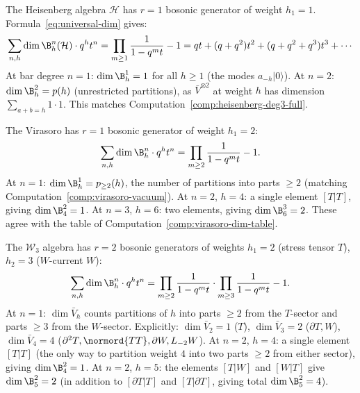 \begin{computation}\label{comp:verify-heisenberg}
The Heisenberg algebra $\mathcal{H}$ has $r = 1$ bosonic generator
of weight $h_1 = 1$.  Formula~\eqref{eq:universal-dim} gives:
\[
\sum_{n,h} \dim \B^n_h(\mathcal{H}) \cdot q^h t^n
= \prod_{m \geq 1} \frac{1}{1 - q^m t} - 1
= qt + (q + q^2)t^2 + (q + q^2 + q^3)t^3 + \cdots
\]
At bar degree $n = 1$: $\dim \B^1_h = 1$ for all $h \geq 1$
(the modes $a_{-h}|0\rangle$).  At $n = 2$: $\dim \B^2_h = p(h)$
(unrestricted partitions), as $\bar{V}^{\otimes 2}$ at weight $h$
has dimension $\sum_{a+b=h} 1 \cdot 1$.
This matches
Computation~\ref{comp:heisenberg-deg3-full}.
\end{computation}

\begin{computation}\label{comp:verify-virasoro}
The Virasoro has $r = 1$ bosonic generator of weight $h_1 = 2$:
\[
\sum_{n,h} \dim \B^n_h \cdot q^h t^n
= \prod_{m \geq 2} \frac{1}{1 - q^m t} - 1.
\]
At $n = 1$:
$\dim \B^1_h = p_{\geq 2}(h)$, the number of partitions into parts
$\geq 2$ (matching Computation~\ref{comp:virasoro-vacuum}).
At $n = 2$, $h = 4$: a single element $[T|T]$,
giving $\dim \B^2_4 = 1$.
At $n = 3$, $h = 6$: two elements, giving $\dim \B^3_6 = 2$.
These agree with the table of Computation~\ref{comp:virasoro-dim-table}.
\end{computation}

\begin{computation}\label{comp:verify-w3}
The $\mathcal{W}_3$ algebra has $r = 2$ bosonic generators of weights
$h_1 = 2$ (stress tensor $T$), $h_2 = 3$ ($W$-current $W$):
\[
\sum_{n,h} \dim \B^n_h \cdot q^h t^n
= \prod_{m \geq 2} \frac{1}{1 - q^m t}
  \cdot \prod_{m \geq 3} \frac{1}{1 - q^m t} - 1.
\]
At $n = 1$: $\dim \bar{V}_h$ counts partitions of $h$ into parts
$\geq 2$ from the $T$-sector and parts $\geq 3$ from the $W$-sector.
Explicitly: $\dim \bar{V}_2 = 1$ ($T$), $\dim \bar{V}_3 = 2$
($\partial T, W$), $\dim \bar{V}_4 = 4$
($\partial^2 T, \normord{TT}, \partial W, L_{-2}W$).
At $n = 2$, $h = 4$: a single element $[T|T]$ (the only way to
partition weight $4$ into two parts $\geq 2$ from either sector),
giving $\dim \B^2_4 = 1$.
At $n = 2$, $h = 5$: the elements $[T|W]$ and $[W|T]$ give
$\dim \B^2_5 = 2$ (in addition to $[\partial T | T]$ and $[T|\partial T]$,
giving total $\dim \B^2_5 = 4$).
\end{computation}


